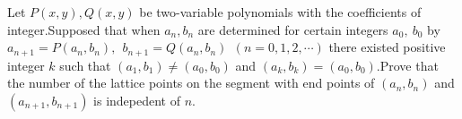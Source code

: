 Let $P(x,y),Q(x,y)$ be two-variable polynomials with the coefficients of integer.Supposed that when $a_n,b_n$ are determined for certain integers $a_0,\ b_0$ by $a_{n+1}=P(a_n,b_n),\ \ b_{n+1}=Q(a_n,b_n)\ \ (n=0,1,2,\cdots)$ there existed positive integer $k$ such that $(a_1,b_1)\neq (a_0,b_0)$ and $(a_k,b_k)=(a_0,b_0)$.Prove that the number of  the lattice points on the segment with end points of $(a_n,b_n)$ and $(a_{n+1},b_{n+1})$ is indepedent of $n$.